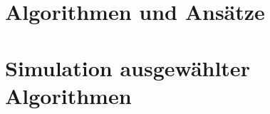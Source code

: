 


\cleardoublepage
{}
\setcounter{page}{1}
\pagestyle{maincontentstyle}


\part{Algorithmen und Ansätze}






\part{Simulation ausgewählter Algorithmen}






